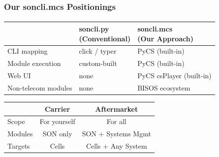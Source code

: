 \begin{verblatex}

\begin{frame}[fragile,plain,label=sonclimcsPositionings]
    \frametitle{Our soncli.mcs Positionings}
    \framesubtitle{}

    \noindent\colorbox{darkgreen}{}

\begin{center}
\begin{tabular}{|l|p{3cm}|p{4.5cm}|}
\hline
 & \centering {\color{magenta} \textbf{soncli.py} \newline \textbf{(Conventional)}} & \centering {\color{darkgreen} \textbf{soncli.mcs} \newline \textbf{(Our Approach)}} \tabularnewline
\hline
CLI mapping         & click / typer          & PyCS (built-in) \\
\hline
Module execution    & custom-built           & PyCS (built-in) \\
\hline
Web UI              & none                   & PyCS csPlayer (built-in) \\
\hline
Non-telecom modules & none                   & BISOS ecosystem \\
\hline
\end{tabular}
\end{center}

    \noindent\colorbox{darkgreen}{}

\begin{center}
\begin{tabular}{|l|c|c|}
\hline
 & {\color{teal} \textbf{Carrier}} & {\color{darkblue} \textbf{Aftermarket}} \\
\hline
Scope   & For yourself  & For all \\
\hline
Modules & SON only      & SON + Systems Mgmt \\
\hline
Targets & Cells         & Cells + Any System \\
\hline
\end{tabular}
\end{center}


\end{frame}
\end{verblatex}

